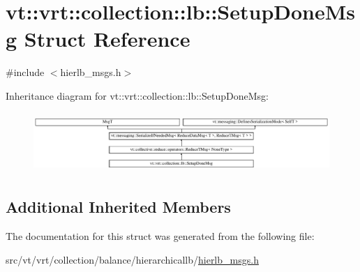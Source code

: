 \hypertarget{structvt_1_1vrt_1_1collection_1_1lb_1_1_setup_done_msg}{}\section{vt\+:\+:vrt\+:\+:collection\+:\+:lb\+:\+:Setup\+Done\+Msg Struct Reference}
\label{structvt_1_1vrt_1_1collection_1_1lb_1_1_setup_done_msg}


{\ttfamily \#include $<$hierlb\+\_\+msgs.\+h$>$}

Inheritance diagram for vt\+:\+:vrt\+:\+:collection\+:\+:lb\+:\+:Setup\+Done\+Msg\+:\begin{figure}[H]
\begin{center}
\leavevmode
\includegraphics[height=2.299795cm]{structvt_1_1vrt_1_1collection_1_1lb_1_1_setup_done_msg}
\end{center}
\end{figure}
\subsection*{Additional Inherited Members}


The documentation for this struct was generated from the following file\+:\begin{DoxyCompactItemize}
\item 
src/vt/vrt/collection/balance/hierarchicallb/\hyperlink{hierlb__msgs_8h}{hierlb\+\_\+msgs.\+h}\end{DoxyCompactItemize}
